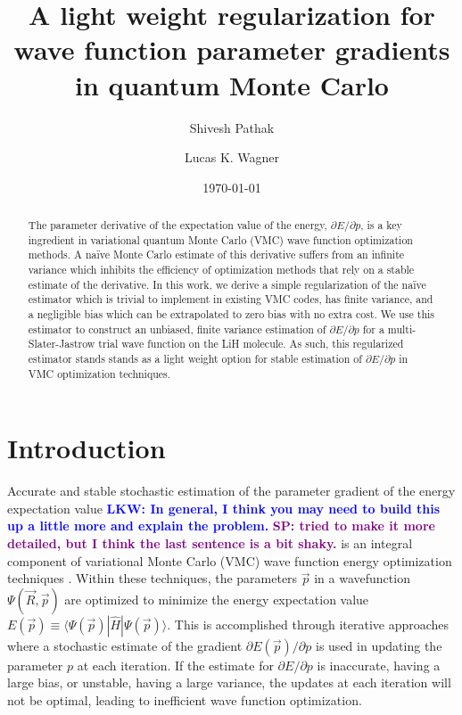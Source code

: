 \documentclass[twocolumn]{revtex4-1}
\newcommand{\lucas}[1]{\textbf{\textcolor{blue}{LKW: #1}}}
\newcommand{\shivesh}[1]{\textbf{\textcolor{purple}{SP: #1}}}
\begin{document}
\title{A light weight regularization for wave function parameter gradients
\\ in quantum Monte Carlo}

\author{Shivesh Pathak}

\author{Lucas K. Wagner}

\date{\today}
\begin{abstract}
The parameter derivative of the expectation value of the energy, $\partial E/\partial p$, is a key ingredient in variational quantum Monte Carlo (VMC) wave function optimization methods.
A na\"ive Monte Carlo estimate of this derivative suffers from an infinite variance which inhibits the efficiency of optimization methods that rely on a stable estimate of the derivative.
In this work, we derive a simple regularization of the na\"ive estimator which is trivial to implement in existing VMC codes, has finite variance, and a negligible bias which can be extrapolated to zero bias with no extra cost.
We use this estimator to construct an unbiased, finite variance estimation of $\partial E/\partial p$ for a multi-Slater-Jastrow trial wave function on the LiH molecule.
As such, this regularized estimator stands stands as a light weight option for stable estimation of $\partial E/\partial p$ in VMC optimization techniques.
\end{abstract}
\maketitle 

\section{Introduction}
Accurate and stable stochastic estimation of the parameter gradient of the energy expectation value \lucas{In general, I think you may need to build this up a little more and explain the problem.} \shivesh{tried to make it more detailed, but I think the last sentence is a bit shaky.} is an integral component of variational Monte Carlo (VMC) wave function energy optimization techniques \cite{PhysRevB.64.024512, doi:10.1063/1.1604379, Toulouse2007, Umrigar2005, Umrigar2007, Toulouse2008}.
Within these techniques, the parameters $\vec{p}$ in a wavefunction $\Psi(\vec{R},\vec{p})$ are optimized to minimize the energy expectation value $E(\vec{p}) \equiv \langle \Psi(\vec{p})|\hat{H} |\Psi(\vec{p})\rangle$.
This is accomplished through iterative approaches where a stochastic estimate of the gradient $\partial E(\vec{p})/\partial p$ is used in updating the parameter $p$ at each iteration. 
If the estimate for $\partial E/\partial p$ is inaccurate, having a large bias, or unstable, having a large variance, the updates at each iteration will not be optimal, leading to inefficient wave function optimization.
\end{document}
